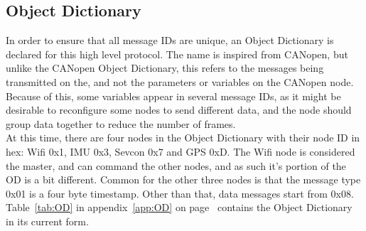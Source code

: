 \subsection{Object Dictionary}\label{sub:OD}
In order to ensure that all message IDs are unique, an Object Dictionary is declared for this high level protocol.
The name is inspired from CANopen, but unlike the CANopen Object Dictionary, this refers to the messages being transmitted on the, and not the parameters or variables on the CANopen node.
Because of this, some variables appear in several message IDs, as it might be desirable to reconfigure some nodes to send different data, and the node should group data together to reduce the number of frames.\\

At this time, there are four nodes in the Object Dictionary with their node ID in hex: Wifi 0x1, IMU 0x3, Sevcon 0x7 and GPS 0xD.
The Wifi node is considered the master, and can command the other nodes, and as such it's portion of the OD is a bit different. 
Common for the other three nodes is that the message type 0x01 is a four byte timestamp.
Other than that, data messages start from 0x08.\\

Table~\ref{tab:OD} in appendix~\ref{app:OD} on page~\pageref{tab} contains the Object Dictionary in its current form.

